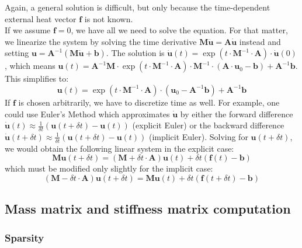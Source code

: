 \documentclass{IOS-Book-Article}
\theoremstyle{plain}
\theoremstyle{definition}
\begin{document}
Again, a general solution is difficult, but only because the time-dependent external heat vector $\mathbf f$ is not known.\\
If we assume $\mathbf f = 0$, we have all we need to solve the equation. For that matter, we linearize the system by solving the time derivative $\mathbf M \mathbf{\ddot u} = \mathbf A \mathbf{\dot u}$ instead and setting $\mathbf u = \mathbf A^{-1} ( \mathbf M \mathbf{\dot u} + \mathbf b )$. The solution is $\mathbf{\dot u}(t) = \exp(t \cdot \mathbf M^{-1} \cdot \mathbf A) \cdot \mathbf{\dot u}(0)$, which means $\mathbf u(t) = \mathbf A^{-1} \mathbf M \cdot \exp (t \cdot \mathbf M^{-1} \cdot \mathbf A) \cdot \mathbf M^{-1} \cdot (\mathbf A \cdot \mathbf u_0 - \mathbf b)  + \mathbf A^{-1} \mathbf b$. This simplifies to:
\begin{equation}
	\mathbf u(t) = \exp (t \cdot \mathbf M^{-1} \cdot \mathbf A) \cdot (\mathbf u_0 - \mathbf A^{-1} \mathbf b) + \mathbf A^{-1} \mathbf b
\end{equation}
If $\mathbf f$ is chosen arbitrarily, we have to discretize time as well. For example, one could use Euler's Method which approximates $\mathbf{\dot u}$ by either the forward difference $\mathbf{\dot u}(t) \approx \frac{1}{\delta t} (\mathbf u (t + \delta t) - \mathbf u (t))$ (explicit Euler) or the backward difference $\mathbf{\dot u}(t + \delta t) \approx \frac{1}{\delta t} (\mathbf u (t + \delta t) - \mathbf u (t))$ (implicit Euler). Solving for $\mathbf u(t + \delta t)$, we would obtain the following linear system in the explicit case:
\begin{equation}
	\mathbf M \mathbf u(t + \delta t) = (\mathbf M + \delta t \cdot \mathbf A) \mathbf{u}(t) + \delta t (\mathbf f(t) - \mathbf b)
\end{equation}
which must be modified only slightly for the implicit case:
\begin{equation}
	(\mathbf M - \delta t \cdot \mathbf A) \mathbf u(t + \delta t) = \mathbf M \mathbf{u}(t) + \delta t (\mathbf f(t + \delta t) - \mathbf b)
\end{equation}

\subsection{Mass matrix and stiffness matrix computation}

\subsubsection{Sparsity}
\end{document}

